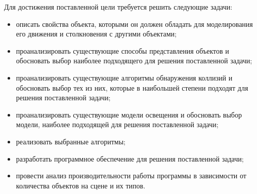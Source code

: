 Для достижения поставленной цели требуется решить следующие задачи:
\begin{itemize}
    \item описать свойства объекта, которыми он должен обладать для моделирования его движения и столкновения с другими объектами;
    \item проанализировать существующие способы представления объектов и обосновать выбор наиболее подходящего для решения поставленной задачи;
    \item проанализировать существующие алгоритмы обнаружения коллизий и обосновать выбор тех из них, которые в наибольшей степени подходят для решения поставленной задачи;
    \item проанализировать существующие модели освещения и обосновать выбор модели, наиболее подходящей для решения поставленной задачи;
    \item реализовать выбранные алгоритмы;
    \item разработать программное обеспечение для решения поставленной задачи;
    \item провести анализ производительности работы программы в зависимости от количества объектов на сцене и их типов.
\end{itemize}
